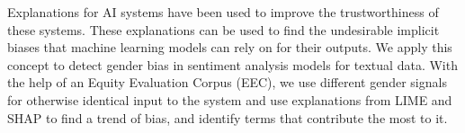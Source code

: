 Explanations for AI systems have been used to improve the trustworthiness of these systems. These explanations can be used to find the undesirable implicit biases that machine learning models can rely on for their outputs. We apply this concept to detect gender bias in sentiment analysis models for textual data. With the help of an Equity Evaluation Corpus (EEC), we use different gender signals for otherwise identical input to the system and use explanations from LIME and SHAP to find a trend of bias, and identify terms that contribute the most to it.

